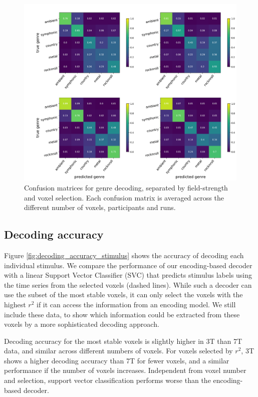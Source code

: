 \begin{figure}
  \centering
  \includegraphics[width=\linewidth]{pics/conf_mats.pdf}

  \caption{ Confusion matrices for genre decoding, separated by field-strength and voxel selection. Each confusion matrix is averaged across the different number of voxels, participants and runs.}

 \label{fig:confusion_matrices}
\end{figure}

\subsection*{Decoding accuracy}

Figure \ref{fig:decoding_accuracy_stimulus} shows the accuracy of decoding each
individual stimulus. We compare the performance of our encoding-based decoder
with a linear Support Vector Classifier (SVC) \citep{FCH+08,V13} that predicts
stimulus labels using the time series from the selected voxels (dashed lines).
While such a decoder can use the subset of the most stable
voxels, it can only select the voxels with the highest $r^2$ if it can access
the information from an encoding model. We still include these data, to show
which information could be extracted from these voxels by a more sophisticated
decoding approach. 

Decoding accuracy for the most stable voxels is slightly higher in 3T than 7T
data, and similar across different numbers of voxels. For voxels selected by
$r^2$, 3T shows a higher decoding accuracy than 7T for fewer voxels, and
a similar performance if the number of voxels increases.
Independent from voxel number and selection, support vector classification
performs worse than the encoding-based decoder.

